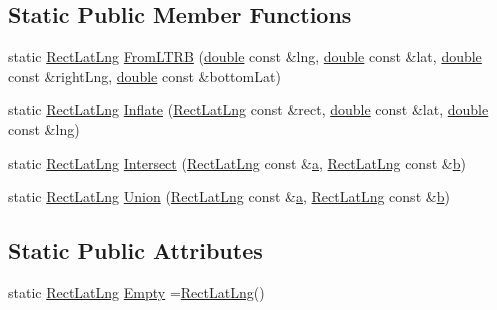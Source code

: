 \subsection*{Static Public Member Functions}
\begin{DoxyCompactItemize}
\item 
static \hyperlink{structinternals_1_1_rect_lat_lng}{Rect\-Lat\-Lng} \hyperlink{group___o_p_map_widget_gaaf71d43bd87065c51a98a46717d581a6}{From\-L\-T\-R\-B} (\hyperlink{_super_l_u_support_8h_a8956b2b9f49bf918deed98379d159ca7}{double} const \&lng, \hyperlink{_super_l_u_support_8h_a8956b2b9f49bf918deed98379d159ca7}{double} const \&lat, \hyperlink{_super_l_u_support_8h_a8956b2b9f49bf918deed98379d159ca7}{double} const \&right\-Lng, \hyperlink{_super_l_u_support_8h_a8956b2b9f49bf918deed98379d159ca7}{double} const \&bottom\-Lat)
\item 
static \hyperlink{structinternals_1_1_rect_lat_lng}{Rect\-Lat\-Lng} \hyperlink{group___o_p_map_widget_ga41e7a0b707e7e348e2d4f9b8aa3f2831}{Inflate} (\hyperlink{structinternals_1_1_rect_lat_lng}{Rect\-Lat\-Lng} const \&rect, \hyperlink{_super_l_u_support_8h_a8956b2b9f49bf918deed98379d159ca7}{double} const \&lat, \hyperlink{_super_l_u_support_8h_a8956b2b9f49bf918deed98379d159ca7}{double} const \&lng)
\item 
static \hyperlink{structinternals_1_1_rect_lat_lng}{Rect\-Lat\-Lng} \hyperlink{group___o_p_map_widget_ga6590bcf87d4c6a72e570bcfcca89a5bf}{Intersect} (\hyperlink{structinternals_1_1_rect_lat_lng}{Rect\-Lat\-Lng} const \&\hyperlink{glext_8h_ac8729153468b5dcf13f971b21d84d4e5}{a}, \hyperlink{structinternals_1_1_rect_lat_lng}{Rect\-Lat\-Lng} const \&\hyperlink{glext_8h_a6eba317e3cf44d6d26c04a5a8f197dcb}{b})
\item 
static \hyperlink{structinternals_1_1_rect_lat_lng}{Rect\-Lat\-Lng} \hyperlink{group___o_p_map_widget_ga2b63b270f234d9f18a58415ff69b37e7}{Union} (\hyperlink{structinternals_1_1_rect_lat_lng}{Rect\-Lat\-Lng} const \&\hyperlink{glext_8h_ac8729153468b5dcf13f971b21d84d4e5}{a}, \hyperlink{structinternals_1_1_rect_lat_lng}{Rect\-Lat\-Lng} const \&\hyperlink{glext_8h_a6eba317e3cf44d6d26c04a5a8f197dcb}{b})
\end{DoxyCompactItemize}
\subsection*{Static Public Attributes}
\begin{DoxyCompactItemize}
\item 
static \hyperlink{structinternals_1_1_rect_lat_lng}{Rect\-Lat\-Lng} \hyperlink{group___o_p_map_widget_ga0975dcf29ee445b5510f2c502940b50a}{Empty} =\hyperlink{structinternals_1_1_rect_lat_lng}{Rect\-Lat\-Lng}()
\end{DoxyCompactItemize}
